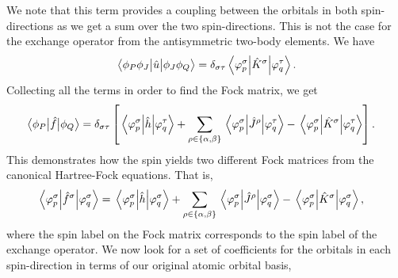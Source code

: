             We note that this term provides a coupling between the orbitals in
            both spin-directions as we get a sum over the two spin-directions.
            This is not the case for the exchange operator from the
            antisymmetric two-body elements.
            We have
            \begin{align}
                \mel{\phi_P\phi_J}{
                    \hat{u}}{\phi_J\phi_Q}
                =
                \delta_{\sigma\tau}
                \mel{\varphi^{\sigma}_{p}}{
                    \hat{K}^{\sigma}
                }{\varphi^{\tau}_{q}}.
            \end{align}
            Collecting all the terms in order to find the Fock matrix, we get
            \begin{align}
                \mel{\phi_P}{\hat{f}}{\phi_Q}
                &=
                \delta_{\sigma\tau}
                \left[ 
                    \mel{\varphi^{\sigma}_{p}}{
                        \hat{h}}{\varphi^{\tau}_{q}}
                    +
                    \sum_{\rho \in \left\{ \alpha, \beta \right\}}
                    \mel{\varphi^{\sigma}_{p}}{
                        \hat{J}^{\rho}
                    }{\varphi^{\tau}_{q}}
                    -
                    \mel{\varphi^{\sigma}_{p}}{
                        \hat{K}^{\sigma}
                    }{\varphi^{\tau}_{q}}
                 \right].
            \end{align}
            This demonstrates how the spin yields two different Fock matrices
            from the canonical Hartree-Fock equations.
            That is,
            \begin{align}
                \mel{\varphi^{\sigma}_{p}}{
                    \hat{f}^{\sigma}
                }{\varphi^{\sigma}_{q}}
                &=
                \mel{\varphi^{\sigma}_{p}}{
                    \hat{h}}{\varphi^{\sigma}_{q}}
                +
                \sum_{\rho \in \left\{ \alpha, \beta \right\}}
                \mel{\varphi^{\sigma}_{p}}{
                    \hat{J}^{\rho}
                }{\varphi^{\sigma}_{q}}
                -
                \mel{\varphi^{\sigma}_{p}}{
                    \hat{K}^{\sigma}
                }{\varphi^{\sigma}_{q}},
            \end{align}
            where the spin label on the Fock matrix corresponds to the spin
            label of the exchange operator.
            We now look for a set of coefficients for the orbitals in each
            spin-direction in terms of our original atomic orbital basis,
